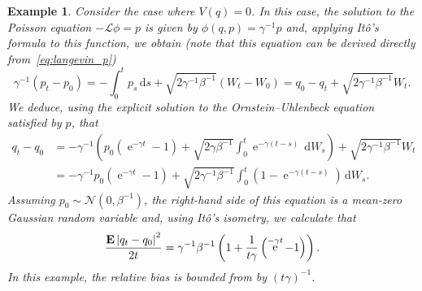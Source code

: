 \documentclass[11pt,a4paper]{article}
\DeclareMathOperator{\e}{e}
\newcommand{\expect}[0]{\mathbf{E}}
\renewcommand{\d}{\mathrm d}
\theoremstyle{plain}
\newtheorem{example}{Example}[section]
\numberwithin{equation}{section}
\begin{document}
\begin{example}
    Consider the case where $V(q) = 0$.
    In this case, the solution to the Poisson equation $- \mathcal L \phi = p$ is given by $\phi(q, p) = \gamma^{-1} p$ and,
    applying Itô's formula to this function, we obtain
    (note that this equation can be derived directly from~\eqref{eq:langevin_p})
    \[
        \gamma^{-1}(p_t - p_0) = - \int_{0}^{t} p_s \, \d s + \sqrt{2 \gamma^{-1} \beta^{-1}} (W_t - W_0)
        = q_0 - q_t + \sqrt{2 \gamma^{-1} \beta^{-1}} W_t.
    \]
    We deduce, using the explicit solution to the Ornstein--Uhlenbeck equation satisfied by $p$, that
    \begin{align*}
        q_t - q_0
        &= - \gamma^{-1} \left( p_0 \left(\e^{-\gamma t} - 1\right) + \sqrt{2 \gamma \beta^{-1}}\int_{0}^{t} \e^{-\gamma (t - s)} \, \d W_s \right)
        + \sqrt{2 \gamma^{-1} \beta^{-1}} W_t \\
        &=  - \gamma^{-1} p_0 \left(\e^{-\gamma t} - 1\right) + \sqrt{2 \gamma^{-1} \beta^{-1}}\int_{0}^{t} \left(1 - \e^{-\gamma (t - s)}\right) \, \d W_s.
    \end{align*}
    Assuming $p_0 \sim \mathcal N(0, \beta^{-1})$,
    the right-hand side of this equation is a mean-zero Gaussian random variable and,
    using It\^o's isometry, we calculate that
    \[
        \frac{\expect \abs{q_t - q_0}^2}{2t} = \gamma^{-1} \beta^{-1} \left( 1 + \frac{1}{t \gamma} \left(\e^{-\gamma t} - 1\right) \right).
    \]
    In this example, the relative bias is bounded from by $(t \gamma)^{-1}$.
\end{example}
\end{document}
